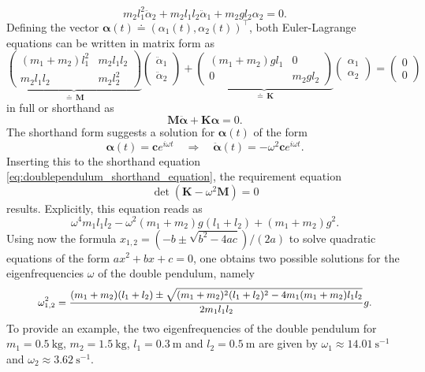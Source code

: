 \documentclass{report}
\numberwithin{tm}{section}
\newcommand\matr[1]{\ensuremath{\boldsymbol{\mathbf{#1}}}}
\newcommand\vect[1]{\ensuremath{\bm{#1}}}
\begin{document}
\begin{equation}
m_2l_1^2\ddot{\alpha}_2 + m_2l_1l_2\ddot{\alpha}_1 + m_2gl_2\alpha_2 = 0.
\end{equation} Defining the vector $\vect{\alpha}(t) \doteq (\alpha_1(t),\alpha_2(t))^\top$, both Euler-Lagrange equations can be written in matrix form as \begin{equation}
\underbrace{\begin{pmatrix}
	(m_1+m_2)l_1^2 & m_2l_1l_2 \\
	m_2l_1l_2 & m_2l_2^2
\end{pmatrix}}_{\doteq\,\matr{M}}\begin{pmatrix}
\ddot{\alpha}_1 \\ \ddot{\alpha}_2
\end{pmatrix} + \underbrace{\begin{pmatrix}
(m_1+m_2)gl_1 & 0 \\ 0 & m_2gl_2
\end{pmatrix}}_{\doteq\,\matr{K}}\begin{pmatrix}
\alpha_1 \\ \alpha_2
\end{pmatrix} = \begin{pmatrix}
0 \\ 0
\end{pmatrix}
\end{equation} in full or shorthand as \begin{equation}\label{eq:doublependulum_shorthand_equation}
\matr{M}\ddot{\vect{\alpha}} + \matr{K}\vect{\alpha} = 0.
\end{equation} The shorthand form suggests a solution for $\vect{\alpha}(t)$ of the form \begin{equation}
\vect{\alpha}(t) = \vect{c}e^{i\omega t} \quad \Rightarrow \quad \ddot{\vect{\alpha}}(t) = -\omega^2\vect{c}e^{i\omega t}.
\end{equation} Inserting this to the shorthand equation \cref{eq:doublependulum_shorthand_equation}, the requirement equation \begin{equation}
\det(\matr{K}-\omega^2\matr{M}) = 0
\end{equation} results. Explicitly, this equation reads as \begin{equation}
\omega^4m_1l_1l_2 - \omega^2(m_1+m_2)g(l_1+l_2) + (m_1+m_2)g^2.
\end{equation} Using now the formula $x_{1,2} = (-b\pm \sqrt{b^2-4ac})/(2a)$ to solve quadratic equations of the form $ax^2 + bx + c = 0$, one obtains two possible solutions for the eigenfrequencies $\omega$ of the double pendulum, namely \begin{align}\small\begin{aligned}
\omega_{1,2}^2 = \frac{(m_1+m_2)(l_1+l_2)\pm \sqrt{(m_1+m_2)^2(l_1+l_2)^2-4m_1(m_1+m_2)l_1l_2}}{2m_1l_1l_2}g.
\end{aligned}\end{align} To provide an example, the two eigenfrequencies of the double pendulum for $m_1 = \SI{0.5}{\kilogram}$, $m_2 = \SI{1.5}{\kilogram}$, $l_1 = \SI{0.3}{\meter}$ and $l_2 = \SI{0.5}{\meter}$ are given by $\omega_1 \approx \SI{14.01}{\second^{-1}}$ and $\omega_2 \approx \SI{3.62}{\second^{-1}}$.
\end{document}
